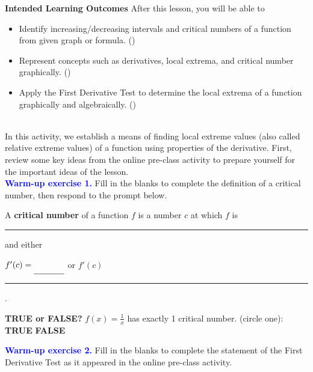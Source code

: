 \documentclass[10pt]{article}
\begin{document}
\pagestyle{otherpages}
\thispagestyle{firstpage}

\textbf{Intended Learning Outcomes}
After this lesson, you will be able to 

\begin{itemize}
    \item Identify increasing/decreasing intervals and critical numbers of a function from given graph or formula. ()
    \item Represent concepts such as derivatives, local extrema, and critical number graphically. ()
    \item Apply the First Derivative Test to determine the local extrema of a function graphically and algebraically. ()
\end{itemize}

\vspace{-0.5cm}

\hrulefill\\

In this activity, we establish a means of finding local extreme values (also called relative extreme values) of a function using properties of the derivative. First, review some key ideas from the online pre-class activity to prepare yourself for the important ideas of the lesson.\\

{\bf \textcolor{blue}{Warm-up exercise 1.}}  Fill in the blanks to complete the definition of a critical number, then respond to the prompt below.
%
    {
    A {\bf critical number} of a function $f$ is a number $c$ at which $f$ is \rule[-8pt]{1.5in}{0.4pt} and either
    \begin{center}
    $f'(c) = \rule[-8pt]{0.5in}{0.4pt}$ \quad\quad\quad or \quad\quad\quad $f'(c)$ \rule[-8pt]{2in}{0.4pt}.
    \end{center}
    }
    
    {\bf TRUE or FALSE?} $\displaystyle f(x)=\frac1x$ has exactly 1 critical number. \hfill (circle one): \hfill {\bf TRUE} \hfill {\bf FALSE}
    
    \vfill

{\bf \textcolor{blue}{Warm-up exercise 2.}} Fill in the blanks to complete the statement of the First Derivative Test as it appeared in the online pre-class activity.
\end{document}
